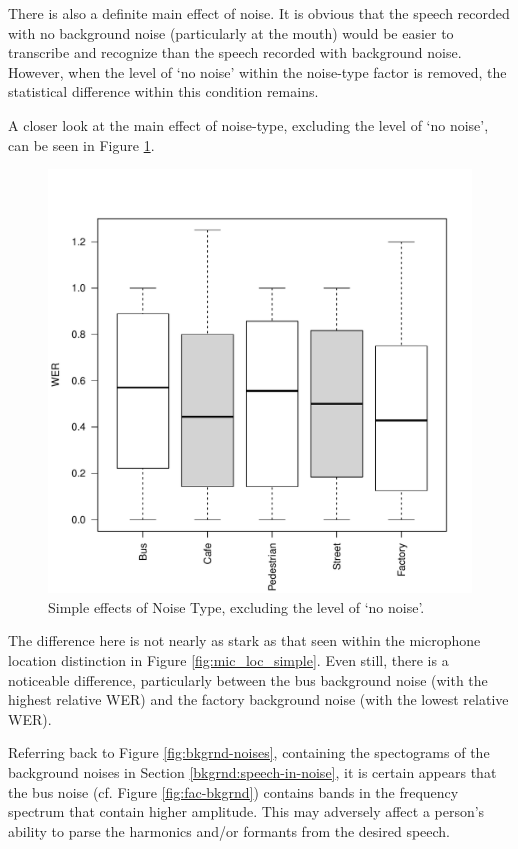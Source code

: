 \documentclass[dissertation,copyright]{uathesis}
\makeatletter
\def\maxwidth{ %
  \ifdim\Gin@nat@width>\linewidth
    \linewidth
  \else
    \Gin@nat@width
  \fi
}
\makeatother
\begin{document}
There is also a definite main effect of noise.  It is obvious that the speech recorded with no background noise (particularly at the mouth) would be easier to transcribe and recognize than the speech recorded with background noise.  However, when the level of `no noise' within the noise-type factor is removed, the statistical difference within this condition remains. 

A closer look at the main effect of noise-type, excluding the level of `no noise', can be seen in Figure \ref{fig:noise-type_non-no-noise_main}.
%
\begin{figure}

\includegraphics[width=\maxwidth]{figure/Noise-type_simple-1} 

\caption{Simple effects of Noise Type, excluding the level of `no noise'.}
\label{fig:noise-type_non-no-noise_main}
\end{figure}
%
The difference here is not nearly as stark as that seen within the microphone location distinction in Figure \ref{fig:mic_loc_simple}.  Even still, there is a noticeable difference, particularly between the bus background noise (with the highest relative WER) and the factory background noise (with the lowest relative WER).  

Referring back to Figure \ref{fig:bkgrnd-noises}, containing the spectograms of the background noises in Section \ref{bkgrnd:speech-in-noise}, it is certain appears that the bus noise (cf. Figure \ref{fig:fac-bkgrnd}) contains bands in the frequency spectrum that contain higher amplitude.  This may adversely affect a person's ability to parse the harmonics and/or formants from the desired speech. 
\end{document}
